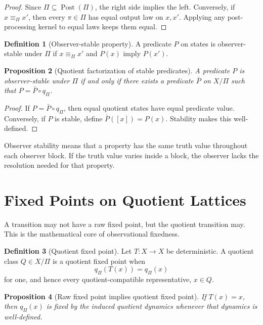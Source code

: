 \documentclass[11pt]{article}
\theoremstyle{definition}
\newtheorem{definition}{Definition}[section]
\theoremstyle{plain}
\newtheorem{proposition}[definition]{Proposition}
\theoremstyle{remark}
\newcommand{\eqobs}{\equiv_{\Pi}}
\begin{document}
\begin{proof}
Since $\Pi\subseteq\operatorname{Post}(\Pi)$, the right side implies the left. Conversely, if $x\equiv_{\Pi}x'$, then every $\pi\in\Pi$ has equal output law on $x,x'$. Applying any post-processing kernel to equal laws keeps them equal.
\end{proof}

\begin{definition}[Observer-stable property]
A predicate $P$ on states is observer-stable under $\Pi$ if $x\eqobs x'$ and $P(x)$ imply $P(x')$.
\end{definition}

\begin{proposition}[Quotient factorization of stable predicates]
A predicate $P$ is observer-stable under $\Pi$ if and only if there exists a predicate $\bar P$ on $X/\Pi$ such that $P=\bar P\circ q_{\Pi}$.
\end{proposition}

\begin{proof}
If $P=\bar P\circ q_{\Pi}$, then equal quotient states have equal predicate value. Conversely, if $P$ is stable, define $\bar P([x])=P(x)$. Stability makes this well-defined.
\end{proof}

Observer stability means that a property has the same truth value throughout each observer block. If the truth value varies inside a block, the observer lacks the resolution needed for that property.

\section{Fixed Points on Quotient Lattices}

A transition may not have a raw fixed point, but the quotient transition may. This is the mathematical core of observational fixedness.

\begin{definition}[Quotient fixed point]
Let $T:X\to X$ be deterministic. A quotient class $Q\in X/\Pi$ is a quotient fixed point when
\[
    q_{\Pi}(T(x))=q_{\Pi}(x)
\]
for one, and hence every quotient-compatible representative, $x\in Q$.
\end{definition}

\begin{proposition}[Raw fixed point implies quotient fixed point]
If $T(x)=x$, then $q_{\Pi}(x)$ is fixed by the induced quotient dynamics whenever that dynamics is well-defined.
\end{proposition}
\end{document}

